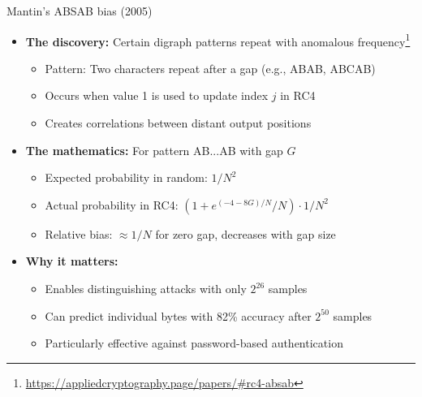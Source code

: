 \documentclass[aspectratio=169, lualatex, handout]{beamer}
\begin{document}
\begin{frame}{Mantin's ABSAB bias (2005)}
	\begin{itemize}[<+->]
		\item \textbf{The discovery:} Certain digraph patterns repeat with anomalous frequency\footnote{\url{https://appliedcryptography.page/papers/\#rc4-absab}}
		      \begin{itemize}[<+->]
			      \item Pattern: Two characters repeat after a gap (e.g., ABAB, ABCAB)
			      \item Occurs when value 1 is used to update index $j$ in RC4
			      \item Creates correlations between distant output positions
		      \end{itemize}
		\item \textbf{The mathematics:} For pattern AB...AB with gap $G$
		      \begin{itemize}[<+->]
			      \item Expected probability in random: $1/N^2$
			      \item Actual probability in RC4: $(1 + e^{(-4-8G)/N}/N) \cdot 1/N^2$
			      \item Relative bias: $\approx 1/N$ for zero gap, decreases with gap size
		      \end{itemize}
		\item \textbf{Why it matters:}
		      \begin{itemize}[<+->]
			      \item Enables distinguishing attacks with only $2^{26}$ samples
			      \item Can predict individual bytes with 82\% accuracy after $2^{50}$ samples
			      \item Particularly effective against password-based authentication
		      \end{itemize}
	\end{itemize}
\end{frame}
\end{document}
